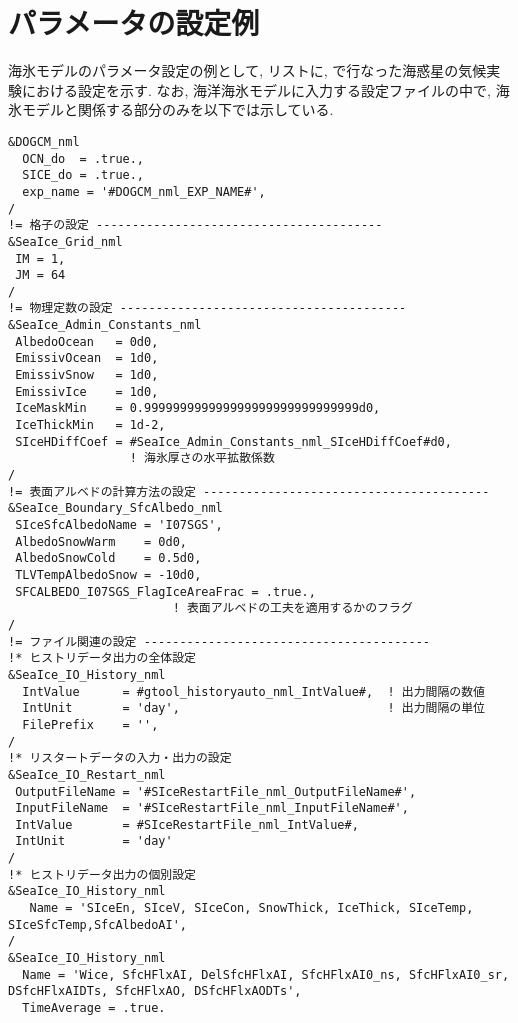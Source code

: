 \section{パラメータの設定例}
海氷モデルのパラメータ設定の例として, リスト\cite{dogcm_Pl64L60_conf_sice}に, 
\cite{ykawai2018_Dthesis}で行なった海惑星の気候実験における設定を示す. 
なお, 海洋海氷モデルに入力する設定ファイルの中で, 海氷モデルと関係する部分のみを以下では示している.
\begin{lstlisting}[caption={
海氷モデルの設定ファイルのテンプレート.
ただし, \#var\#のように書かれた部分は実験ケース等ごとに適切な値が入る.
},label={dogcm_Pl64L60_conf_sice},
basicstyle=\ttfamily\footnotesize,
frame=single]
&DOGCM_nml
  OCN_do  = .true.,
  SICE_do = .true.,
  exp_name = '#DOGCM_nml_EXP_NAME#',
/
!= 格子の設定 ----------------------------------------
&SeaIce_Grid_nml
 IM = 1,
 JM = 64
/
!= 物理定数の設定 ----------------------------------------
&SeaIce_Admin_Constants_nml
 AlbedoOcean   = 0d0, 
 EmissivOcean  = 1d0,
 EmissivSnow   = 1d0,
 EmissivIce    = 1d0,
 IceMaskMin    = 0.999999999999999999999999999999d0,
 IceThickMin   = 1d-2, 
 SIceHDiffCoef = #SeaIce_Admin_Constants_nml_SIceHDiffCoef#d0, 
                 ! 海氷厚さの水平拡散係数
/
!= 表面アルベドの計算方法の設定 ----------------------------------------
&SeaIce_Boundary_SfcAlbedo_nml
 SIceSfcAlbedoName = 'I07SGS',
 AlbedoSnowWarm    = 0d0,
 AlbedoSnowCold    = 0.5d0,
 TLVTempAlbedoSnow = -10d0, 
 SFCALBEDO_I07SGS_FlagIceAreaFrac = .true.,  
                       ! 表面アルベドの工夫を適用するかのフラグ
/
!= ファイル関連の設定 ----------------------------------------
!* ヒストリデータ出力の全体設定 
&SeaIce_IO_History_nml
  IntValue      = #gtool_historyauto_nml_IntValue#,  ! 出力間隔の数値
  IntUnit       = 'day',                             ! 出力間隔の単位
  FilePrefix    = '',
/
!* リスタートデータの入力・出力の設定
&SeaIce_IO_Restart_nml
 OutputFileName = '#SIceRestartFile_nml_OutputFileName#', 
 InputFileName  = '#SIceRestartFile_nml_InputFileName#', 
 IntValue       = #SIceRestartFile_nml_IntValue#, 
 IntUnit        = 'day'
/
!* ヒストリデータ出力の個別設定
&SeaIce_IO_History_nml
   Name = 'SIceEn, SIceV, SIceCon, SnowThick, IceThick, SIceTemp, SIceSfcTemp,SfcAlbedoAI', 
/
&SeaIce_IO_History_nml
  Name = 'Wice, SfcHFlxAI, DelSfcHFlxAI, SfcHFlxAI0_ns, SfcHFlxAI0_sr, DSfcHFlxAIDTs, SfcHFlxAO, DSfcHFlxAODTs', 
  TimeAverage = .true.
\end{lstlisting}
